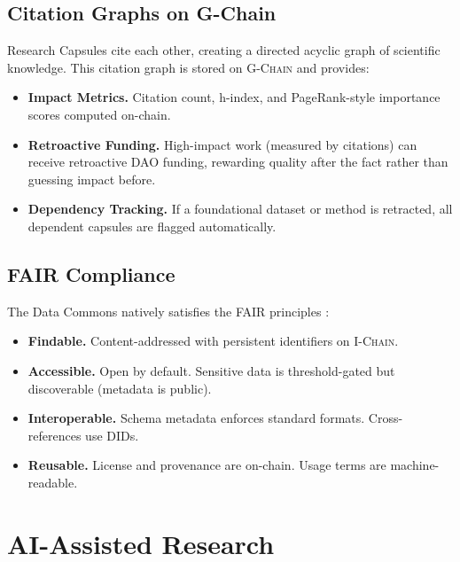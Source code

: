 \documentclass[11pt,letterpaper]{article}
\theoremstyle{definition}
\theoremstyle{remark}
\newcommand{\IChain}{\textsc{I-Chain}}
\newcommand{\GChain}{\textsc{G-Chain}}
\newcommand{\DAO}{\textsc{DAO}}
\begin{document}
\subsection{Citation Graphs on G-Chain}

Research Capsules cite each other, creating a directed acyclic graph of scientific knowledge. This citation graph is stored on \GChain{} and provides:

\begin{itemize}
    \item \textbf{Impact Metrics.} Citation count, h-index, and PageRank-style importance scores computed on-chain.
    \item \textbf{Retroactive Funding.} High-impact work (measured by citations) can receive retroactive \DAO{} funding, rewarding quality after the fact rather than guessing impact before.
    \item \textbf{Dependency Tracking.} If a foundational dataset or method is retracted, all dependent capsules are flagged automatically.
\end{itemize}

\subsection{FAIR Compliance}

The Data Commons natively satisfies the FAIR principles \cite{wilkinson2016fair}:

\begin{itemize}
    \item \textbf{Findable.} Content-addressed with persistent identifiers on \IChain{}.
    \item \textbf{Accessible.} Open by default. Sensitive data is threshold-gated but discoverable (metadata is public).
    \item \textbf{Interoperable.} Schema metadata enforces standard formats. Cross-references use DIDs.
    \item \textbf{Reusable.} License and provenance are on-chain. Usage terms are machine-readable.
\end{itemize}

\section{AI-Assisted Research}
\label{sec:ai}
\end{document}

